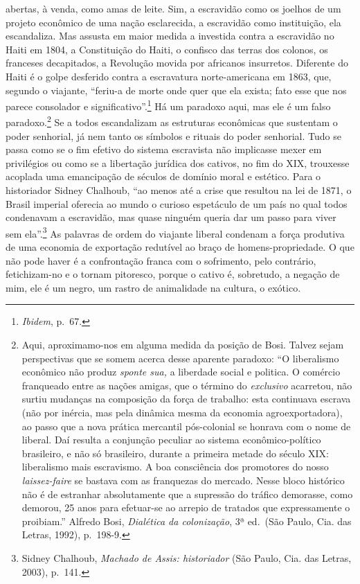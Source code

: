 abertas, à venda, como amas de leite. Sim, a escravidão como os joelhos
de um projeto econômico de uma nação esclarecida, a escravidão como
instituição, ela escandaliza. Mas assusta em maior medida a investida
contra a escravidão no Haiti em 1804, a Constituição do Haiti, o
confisco das terras dos colonos, os franceses decapitados, a Revolução
movida por africanos insurretos. Diferente do Haiti é o golpe desferido
contra a escravatura norte-americana em 1863, que, segundo o viajante,
``feriu-a de morte onde quer que ela exista; fato esse que nos parece
consolador e significativo''.\footnote{\emph{Ibidem}, p.~67.} Há um
paradoxo aqui, mas ele é um falso paradoxo.\footnote{Aqui,
  aproximamo-nos em alguma medida da posição de Bosi. Talvez sejam
  perspectivas que se somem acerca desse aparente paradoxo: ``O
  liberalismo econômico não produz \emph{sponte sua,} a liberdade social
  e politica. O comércio franqueado entre as nações amigas, que o
  término do \emph{exclusivo} acarretou, não surtiu mudanças na
  composição da força de trabalho: esta continuava escrava (não por
  inércia, mas pela dinâmica mesma da economia agroexportadora), ao
  passo que a nova prática mercantil pós-colonial se honrava com o nome
  de liberal. Daí resulta a conjunção peculiar ao sistema
  econômico-político brasileiro, e não só brasileiro, durante a primeira
  metade do século XIX: liberalismo mais escravismo. A boa consciência
  dos promotores do nosso \emph{laissez-faire} se bastava com as
  franquezas do mercado. Nesse bloco histórico não é de estranhar
  absolutamente que a supressão do tráfico demorasse, como demorou, 25
  anos para efetuar-se ao arrepio de tratados que expressamente o
  proibiam.'' Alfredo Bosi, \emph{Dialética da colonização}, 3ª ed.~(São
  Paulo, Cia. das Letras, 1992), p.~198-9.} Se a todos escandalizam as
estruturas econômicas que sustentam o poder senhorial, já nem tanto os
símbolos e rituais do poder senhorial. Tudo se passa como se o fim
efetivo do sistema escravista não implicasse mexer em privilégios ou
como se a libertação jurídica dos cativos, no fim do XIX, trouxesse
acoplada uma emancipação de séculos de domínio moral e estético. Para o
historiador Sidney Chalhoub, ``ao menos até a crise que resultou na lei
de 1871, o Brasil imperial oferecia ao mundo o curioso espetáculo de um
país no qual todos condenavam a escravidão, mas quase ninguém queria dar
um passo para viver sem ela''.\footnote{Sidney Chalhoub, \emph{Machado
  de Assis: historiador} (São Paulo, Cia. das Letras, 2003), p.~141.} As
palavras de ordem do viajante liberal condenam a força produtiva de uma
economia de exportação redutível ao braço de homens-propriedade. O que
não pode haver é a confrontação franca com o sofrimento, pelo contrário,
fetichizam-no e o tornam pitoresco, porque o cativo é, sobretudo, a
negação de mim, ele é um negro, um rastro de animalidade na cultura, o
exótico.

